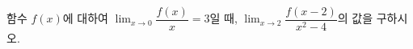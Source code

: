 함수 $f(x)$에 대하여 $\displaystyle\lim_{x\to 0}\dfrac{f(x)}{x}=3$일 때, $\displaystyle\lim_{x\to 2}\dfrac{f(x-2)}{x^2-4}$의 값을 구하시오.
